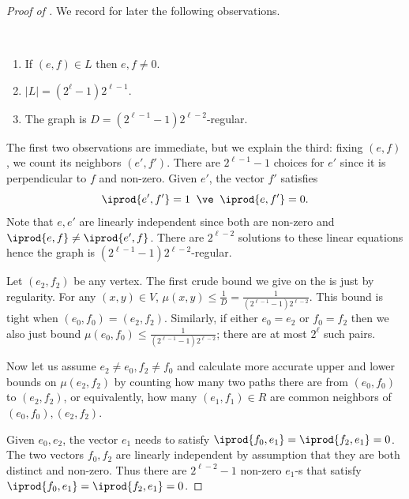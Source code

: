 \begin{proof}[Proof of ]
    \medskip
    
    We record for later the following observations.
    \begin{observation}~ \label{obs:basic-facts-about-base-case}
        \begin{enumerate}
            \item If \((e,f) \in L\) then \(e,f \ne 0\).
            \item \(|L| = (2^\ell-1)2^{\ell-1}\).
            \item The graph is \(D=(2^{\ell-1}-1)2^{\ell-2}\)-regular.
        \end{enumerate}
    \end{observation}
    The first two observations are immediate, but we explain the third: fixing \((e,f)\), we count its neighbors \((e',f')\). There are \(2^{\ell-1}-1\) choices for \(e'\) since it is perpendicular to \(f\) and non-zero. Given \(e'\), the vector \(f'\) satisfies \[\iprod{e',f'}=1 \; \; \ve \; \; \iprod{e,f'}=0.\]
    Note that \(e,e'\) are linearly independent since both are non-zero and \(\iprod{e,f} \ne \iprod{e',f}\). There are \(2^{\ell-2}\) solutions to these linear equations hence the graph is \((2^{\ell-1}-1)2^{\ell-2}\)-regular. 

    \medskip
    
    Let \((e_2,f_2)\) be any vertex. The first crude bound we give on the is just by regularity. For any \((x,y) \in V\), \(\mu(x,y) \leq \frac{1}{D} = \frac{1}{(2^{\ell-1}-1)2^{\ell-2}}\). This bound is tight when \((e_0,f_0) = (e_2,f_2)\). Similarly, if either \(e_0 = e_2\) or \(f_0 = f_2\) then we also just bound \(\mu(e_0,f_0) \leq \frac{1}{(2^{\ell-1}-1)2^{\ell-2}}\); there are at most \(2^{\ell}\) such pairs.
    
    Now let us assume \(e_2 \ne e_0, f_2 \ne f_0\) and calculate more accurate upper and lower bounds on \(\mu(e_2,f_2)\) by counting how many two paths there are from \((e_0,f_0)\) to \((e_2,f_2)\), or equivalently, how many \((e_1,f_1) \in R\) are common neighbors of \((e_0,f_0),(e_2,f_2)\).
    
    Given \(e_0,e_2\), the vector \(e_1\) needs to satisfy \(\iprod{f_0,e_1}=\iprod{f_2,e_1}=0\). The two vectors \(f_0,f_2\) are linearly independent by assumption that they are both distinct and non-zero. Thus there are \(2^{\ell-2}-1\) non-zero \(e_1\)-s that satisfy \(\iprod{f_0,e_1}=\iprod{f_2,e_1}=0\). 
    

\end{proof}
